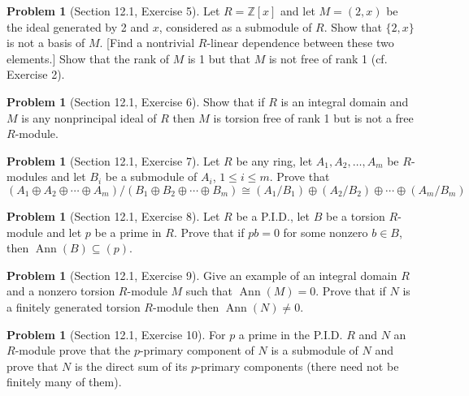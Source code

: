 \documentclass{amsart}
\numberwithin{equation}{section}
\theoremstyle{definition}
\newtheorem{problem}[thm]{Problem}
\begin{document}
\begin{problem}[Section 12.1, Exercise 5]
 Let \(R=\mathbb{Z}[x]\) and let \(M=(2, x)\) be the ideal generated by 2 and \(x\), considered as a submodule of \(R\). Show that \(\{2, x\}\) is not a basis of \(M\). [Find a nontrivial \(R\)-linear dependence between these two elements.] Show that the rank of \(M\) is 1 but that \(M\) is not free of rank 1 (cf. Exercise 2). 
\end{problem}


\begin{problem}[Section 12.1, Exercise 6]
 Show that if \(R\) is an integral domain and \(M\) is any nonprincipal ideal of \(R\) then \(M\) is torsion free of rank 1 but is not a free \(R\)-module. 
\end{problem}


\begin{problem}[Section 12.1, Exercise 7]
 Let \(R\) be any ring, let \(A_1, A_2, \ldots, A_m\) be \(R\)-modules and let \(B_i\) be a submodule of \(A_i\), \(1 \leq i \leq m\). Prove that
\[
\left(A_1 \oplus A_2 \oplus \cdots \oplus A_m\right) /\left(B_1 \oplus B_2 \oplus \cdots \oplus B_m\right) \cong\left(A_1 / B_1\right) \oplus\left(A_2 / B_2\right) \oplus \cdots \oplus\left(A_m / B_m\right)
\] 
\end{problem}


\begin{problem}[Section 12.1, Exercise 8]
 Let \(R\) be a P.I.D., let \(B\) be a torsion \(R\)-module and let \(p\) be a prime in \(R\). Prove that if \(p b=0\) for some nonzero \(b \in B\), then \(\operatorname{Ann}(B) \subseteq(p)\). 
\end{problem}


\begin{problem}[Section 12.1, Exercise 9]
 Give an example of an integral domain \(R\) and a nonzero torsion \(R\)-module \(M\) such that \(\operatorname{Ann}(M)=0\). Prove that if \(N\) is a finitely generated torsion \(R\)-module then \(\operatorname{Ann}(N) \neq 0\). 
\end{problem}


\begin{problem}[Section 12.1, Exercise 10]
 For \(p\) a prime in the P.I.D. \(R\) and \(N\) an \(R\)-module prove that the \(p\)-primary component of \(N\) is a submodule of \(N\) and prove that \(N\) is the direct sum of its \(p\)-primary components (there need not be finitely many of them). 
\end{problem}
\end{document}
